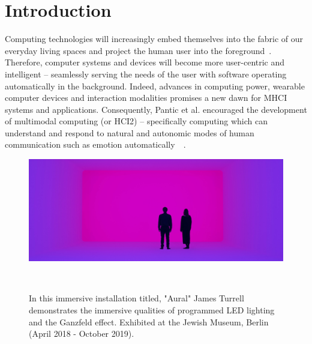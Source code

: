 \documentclass{sigchi}
\begin{document}
\section{Introduction}

Computing technologies will increasingly embed themselves into the fabric of our everyday living spaces and project the human user into the foreground~\cite{6634207}. Therefore, computer systems and devices will become more user-centric and intelligent – seamlessly serving the needs of the user with software operating automatically in the background. Indeed, advances in computing power, wearable computer devices and interaction modalities promises a new dawn for MHCI systems and applications. Consequently, Pantic et al. encouraged the development of multimodal computing (or HCI2) – specifically computing which can understand and respond to natural and autonomic modes of human communication such as emotion automatically~\cite{pantic2008human}~\cite{6634207}.

\begin{figure}
  \centering
  \includegraphics[width=1.75\columnwidth]{figures/turrell}
  \caption{In this immersive installation titled, "Aural" James Turrell demonstrates the immersive qualities of programmed LED lighting and the Ganzfeld effect. Exhibited at the Jewish Museum, Berlin (April 2018 - October 2019).}~\label{fig:figure1}
\end{figure}
\end{document}
